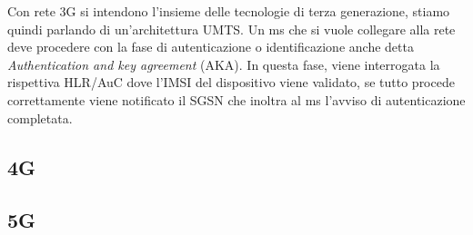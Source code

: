 Con rete 3G si intendono l'insieme delle tecnologie di terza generazione, stiamo quindi parlando di un'architettura UMTS.
Un \acrshort{ms} che si vuole collegare alla rete deve procedere con la fase di autenticazione o identificazione anche detta \textit{Authentication and key agreement}
(AKA). In questa fase, viene interrogata la rispettiva HLR/AuC dove l'IMSI del dispositivo viene validato, se tutto procede correttamente
viene notificato il SGSN che inoltra al \acrshort{ms} l'avviso di autenticazione completata.

\subsection{4G}

\subsection{5G}